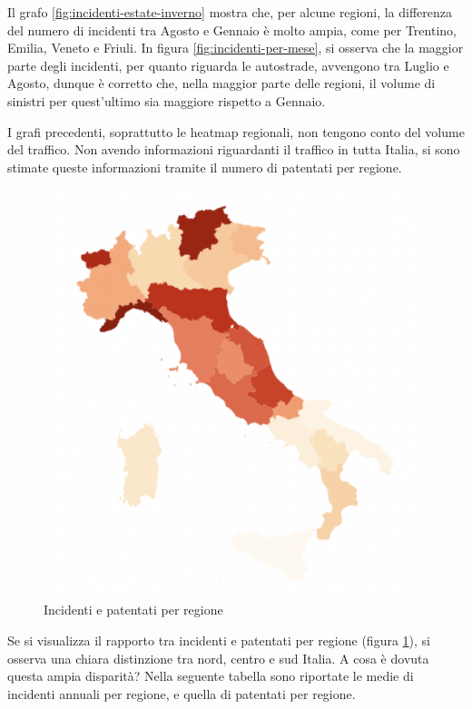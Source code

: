 \documentclass[a4paper]{report}
\begin{document}
Il grafo \ref{fig:incidenti-estate-inverno} mostra che, per alcune regioni, la differenza del  
numero di incidenti tra Agosto e Gennaio è molto ampia, come per Trentino, Emilia, Veneto e Friuli.
In figura \ref{fig:incidenti-per-mese}, si osserva che la maggior parte degli incidenti, 
per quanto riguarda le autostrade, avvengono tra Luglio e Agosto, dunque è corretto che,  
nella maggior parte delle regioni, il volume di sinistri per quest'ultimo sia maggiore rispetto a Gennaio. 

I grafi precedenti, soprattutto le heatmap regionali, non tengono conto del volume del traffico.
Non avendo informazioni riguardanti il traffico in tutta Italia, si sono stimate queste informazioni 
tramite il numero di patentati per regione.

\begin{figure}
    \includegraphics[width=\linewidth]{../src/incidenti/incidenti_aci/mappe_regioni/incidenti_patenti.png}
    \caption{Incidenti e patentati per regione}
    \label{fig:incidenti-patentati}
\end{figure}

Se si visualizza il rapporto tra incidenti e patentati per regione (figura \ref{fig:incidenti-patentati}), 
si osserva una chiara distinzione tra nord, centro e sud Italia.
A cosa è dovuta questa ampia disparità?
Nella seguente tabella sono riportate le medie di incidenti annuali per regione, 
e quella di patentati per regione.
\end{document}
